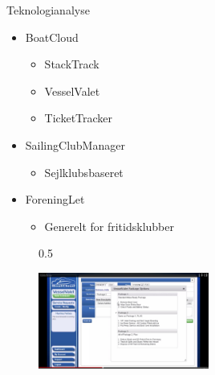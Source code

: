 \begin{frame}{Teknologianalyse}
  \begin{itemize}
    \item BoatCloud
    \begin{itemize}
      \item StackTrack
      \item VesselValet
      \item TicketTracker
    \end{itemize}
    \item SailingClubManager
    \begin{itemize}
      \item Sejlklubsbaseret
    \end{itemize}
    \item ForeningLet
    \begin{itemize}
      \item Generelt for fritidsklubber
    \end{itemize}
  \end{itemize}
  \begin{figure}{0.5\textwidth}
    
    \vspace{-30pt}
    \begin{center}
        \includegraphics[width=0.5\textwidth]{images/VesselValet.jpg}
    \end{center}
    \vspace{-15pt}
    \vspace{-15pt}
\end{figure}
  
\end{frame}

